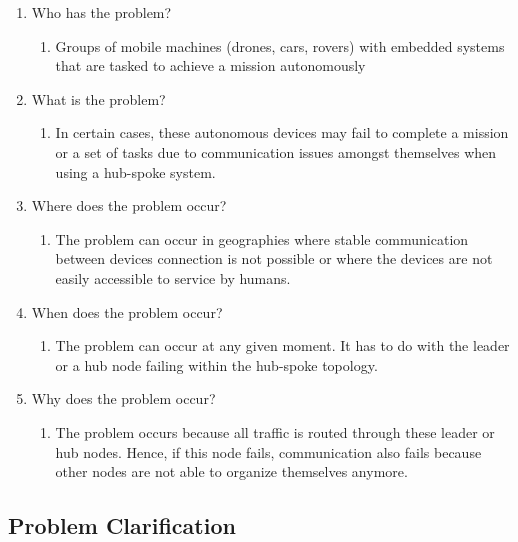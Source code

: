 \documentclass[compsoc]{IEEEtran}
\begin{document}
\begin{enumerate}

    \item Who has the problem?
    \begin{enumerate}
        \item Groups of mobile machines (drones, cars, rovers) with embedded systems that are tasked to achieve a mission autonomously
    \end{enumerate}
    
    \item What is the problem?
    \begin{enumerate}
        \item In certain cases, these autonomous devices may fail to complete a mission or a set of tasks due to communication issues amongst themselves when using a hub-spoke system.
    \end{enumerate}
    
    \item Where does the problem occur?
    \begin{enumerate}
        \item The problem can occur in geographies where stable communication between devices connection is not possible or where the devices are not easily accessible to service by humans.
    \end{enumerate}
    
    \item When does the problem occur?
    \begin{enumerate}
        \item The problem can occur at any given moment. It has to do with the leader or a hub node failing within the hub-spoke topology.
    \end{enumerate}
    
    \item Why does the problem occur?
    \begin{enumerate}
        \item The problem occurs because all traffic is routed through these leader or hub nodes. Hence, if this node fails, communication also fails because other nodes are not able to organize themselves anymore.
    \end{enumerate}
\end{enumerate}


\subsection{Problem Clarification}
\end{document}
